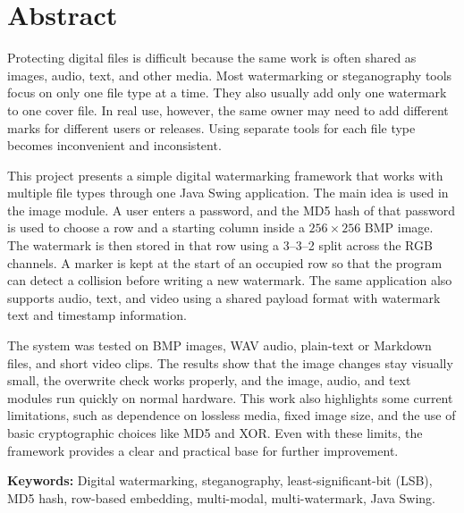 \chapter{Abstract}
\onehalfspacing

Protecting digital files is difficult because the same work is often shared as images, audio, text, and other media. Most watermarking or steganography tools focus on only one file type at a time. They also usually add only one watermark to one cover file. In real use, however, the same owner may need to add different marks for different users or releases. Using separate tools for each file type becomes inconvenient and inconsistent.

This project presents a simple digital watermarking framework that works with multiple file types through one Java Swing application. The main idea is used in the image module. A user enters a password, and the MD5 hash of that password is used to choose a row and a starting column inside a $256 \times 256$ BMP image. The watermark is then stored in that row using a 3--3--2 split across the RGB channels. A marker is kept at the start of an occupied row so that the program can detect a collision before writing a new watermark. The same application also supports audio, text, and video using a shared payload format with watermark text and timestamp information.

The system was tested on BMP images, WAV audio, plain-text or Markdown files, and short video clips. The results show that the image changes stay visually small, the overwrite check works properly, and the image, audio, and text modules run quickly on normal hardware. This work also highlights some current limitations, such as dependence on lossless media, fixed image size, and the use of basic cryptographic choices like MD5 and XOR. Even with these limits, the framework provides a clear and practical base for further improvement.

\textbf{Keywords:} Digital watermarking, steganography, least-significant-bit (LSB), MD5 hash, row-based embedding, multi-modal, multi-watermark, Java Swing.
